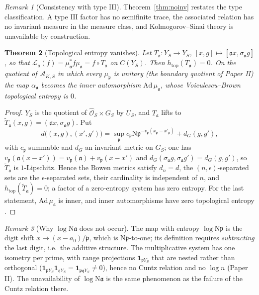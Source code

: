 \documentclass[11pt]{amsart}
\numberwithin{equation}{section}
\newtheorem{theorem}{Theorem}[section]
\theoremstyle{definition}
\theoremstyle{remark}
\newtheorem{remark}[theorem]{Remark}
\newcommand{\cA}{\mathcal{A}}
\newcommand{\cL}{\mathcal{L}}
\newcommand{\pp}{\mathfrak{p}}
\newcommand{\aaa}{\mathfrak{a}}
\newcommand{\qq}{\mathfrak{q}}
\newcommand{\hO}{\widehat{\mathcal{O}}}
\newcommand{\Ns}{\mathrm{N}}
\begin{document}
\begin{remark}[Consistency with type $\mathrm{III}$]\label{rem:typeIII}
Theorem~\ref{thm:noinv} restates the type classification. A type $\mathrm{III}$ factor has no
semifinite trace, the associated relation has no invariant measure in the measure class, and
Kolmogorov--Sinai theory is unavailable by construction.
\end{remark}

\begin{theorem}[Topological entropy vanishes]\label{thm:ht}
Let $T_\aaa:Y_S\to Y_S$, $[x,g]\mapsto[\aaa x,\sigma_\aaa g]$, so that
$\cL_\aaa(f)=\mu_\aaa^*f\mu_\aaa=f\circ T_\aaa$ on $C(Y_S)$. Then $h_{\mathrm{top}}(T_\aaa)=0$.
On the quotient of $\cA_{K,S}$ in which every $\mu_\pp$ is unitary (the boundary quotient
of Paper II) the map $\alpha_\aaa$ becomes the inner automorphism $\mathrm{Ad}\,\mu_\aaa$,
whose Voiculescu--Brown topological entropy \cite{Voiculescu,Brown} is $0$.
\end{theorem}

\begin{proof}
$Y_S$ is the quotient of $\hO_S\times G_S$ by $U_S$, and $T_\aaa$ lifts to
$\widetilde T_\aaa(x,g)=(\aaa x,\sigma_\aaa g)$. Put
\[
d\bigl((x,g),(x',g')\bigr)=\sup_\pp c_\pp\Ns\pp^{-v_\pp(x_\pp-x'_\pp)}+d_G(g,g'),
\]
with $c_\pp$ summable and $d_G$ an invariant metric on $G_S$; one has $v_\pp(\aaa(x-x'))=v_\pp(\aaa)+v_\pp(x-x')$ and
$d_G(\sigma_\aaa g,\sigma_\aaa g')=d_G(g,g')$, so $\widetilde T_\aaa$ is $1$-Lipschitz.
Hence the Bowen metrics satisfy $d_n=d$, the $(n,\epsilon)$-separated sets are the
$\epsilon$-separated sets, their cardinality is independent of $n$, and
$h_{\mathrm{top}}(\widetilde T_\aaa)=0$; a factor of a zero-entropy system has zero entropy.
For the last statement, $\mathrm{Ad}\,\mu_\aaa$ is inner, and inner automorphisms have
zero topological entropy \cite{Brown}.
\end{proof}

\begin{remark}[Why $\log\Ns\aaa$ does not occur]\label{rem:nolog}
The map with entropy $\log\Ns\pp$ is the digit shift $x\mapsto(x-a_0)/\pp$, which is
$\Ns\pp$-to-one; its definition requires \emph{subtracting} the last digit, i.e.\ the
additive structure. The multiplicative system has one isometry per prime, with
range projections $\mathbf 1_{\pp Y_S}$ that are nested rather than orthogonal
($\mathbf 1_{\pp Y_S}\mathbf 1_{\qq Y_S}=\mathbf 1_{\pp\qq Y_S}\ne0$), hence no Cuntz relation and no
$\log n$ (Paper II). The
unavailability of $\log\Ns\aaa$ is the same phenomenon as the failure of the Cuntz relation
there.
\end{remark}
\end{document}
